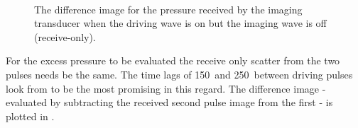\begin{figure}[t]%
  \centering
 \quad
  \subfloat[150]{
    \label{fig:exp:control:av:time:150:diff}
    }\\
 \quad
  \subfloat[250]{
    \label{fig:exp:control:av:time:250:diff}
    }
\caption{
    The difference image for the pressure received  by the imaging transducer when the driving wave is on but the imaging wave is off (receive-only).
  }
  \label{fig:exp:control:av:time:diff}
\end{figure}


For the excess pressure to be evaluated the receive only scatter from the two pulses needs be the same.
The time lags of \unit{150}\micro\second\ and \unit{250}\micro\second\  between driving pulses 
look from 
to be the most promising in this regard.
The difference image 
- evaluated by subtracting the received second pulse image from the first -
is plotted in .


